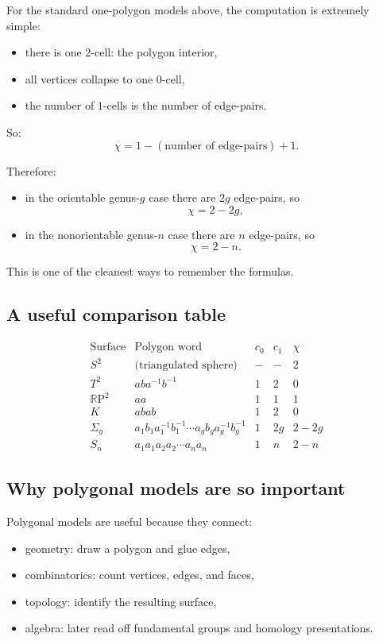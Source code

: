 \documentclass[12pt,a4paper]{article}
\newcommand{\RP}{\mathbb{R}\mathrm{P}}
\theoremstyle{notespace}
\begin{document}
For the standard one-polygon models above, the computation is extremely simple:
\begin{itemize}
	\item there is one \(2\)-cell: the polygon interior,
	\item all vertices collapse to one \(0\)-cell,
	\item the number of \(1\)-cells is the number of edge-pairs.
\end{itemize}

So:
\[
\chi = 1 - (\text{number of edge-pairs}) + 1.
\]

Therefore:
\begin{itemize}
	\item in the orientable genus-\(g\) case there are \(2g\) edge-pairs, so
	\[
	\chi=2-2g,
	\]
	\item in the nonorientable genus-\(n\) case there are \(n\) edge-pairs, so
	\[
	\chi=2-n.
	\]
\end{itemize}

This is one of the cleanest ways to remember the formulas.

\subsection{A useful comparison table}

\[
\begin{array}{c|c|c|c|c}
	\text{Surface} & \text{Polygon word} & c_0 & c_1 & \chi \\ \hline
	S^2 & \text{(triangulated sphere)} & - & - & 2 \\
	T^2 & aba^{-1}b^{-1} & 1 & 2 & 0 \\
	\RP^2 & aa & 1 & 1 & 1 \\
	K & abab & 1 & 2 & 0 \\
	\Sigma_g & a_1b_1a_1^{-1}b_1^{-1}\cdots a_gb_ga_g^{-1}b_g^{-1} & 1 & 2g & 2-2g \\
	S_n & a_1a_1a_2a_2\cdots a_na_n & 1 & n & 2-n
\end{array}
\]

\subsection{Why polygonal models are so important}

Polygonal models are useful because they connect:
\begin{itemize}
	\item geometry: draw a polygon and glue edges,
	\item combinatorics: count vertices, edges, and faces,
	\item topology: identify the resulting surface,
	\item algebra: later read off fundamental groups and homology presentations.
\end{itemize}
\end{document}
